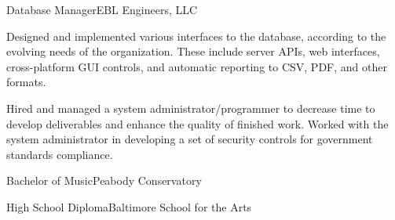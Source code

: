 \begin{jobs}
\begin{job}{Database Manager}{EBL Engineers, LLC}
{            Designed and implemented various interfaces to the database,
            according to the evolving needs of the organization. These include
            server APIs, web interfaces, cross-platform GUI controls, and
            automatic reporting to CSV, PDF, and other formats.

            Hired and managed a system administrator/programmer to decrease
            time to develop deliverables and enhance the quality of finished
            work.  Worked with the system administrator in developing a set of
            security controls for government standards compliance.
        }
    \end{job}
\end{jobs}

\begin{education}
    \begin{degree}{Bachelor of Music}{Peabody Conservatory}
    \end{degree}

    \begin{degree}{High School Diploma}{Baltimore School for the Arts}
    \end{degree}
\end{education}
